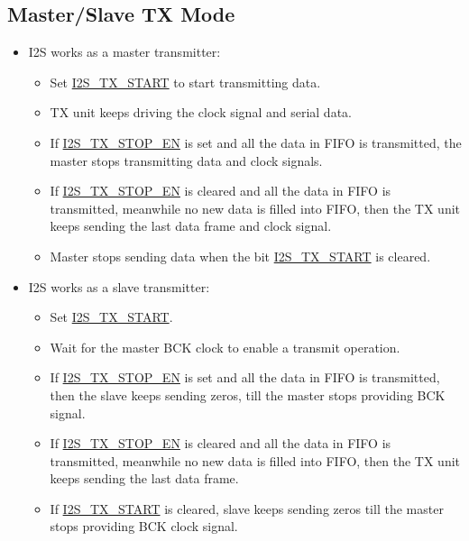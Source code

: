 \documentclass[main\_\_EN.tex]{subfiles}
\begin{document}
\subsection{Master/Slave TX Mode} \label{sec:i2s-master-slave-tx-mode}
\begin{itemize}
    \item I2S works as a master transmitter:
    \begin{itemize}
        \item Set  \hyperref[fielddesc:I2STXSTART]{I2S\_TX\_START} to start transmitting data.
        \item TX unit keeps driving the clock signal and serial data.
        \item If  \hyperref[fielddesc:I2STXSTOPEN]{I2S\_TX\_STOP\_EN} is set and all the data in FIFO is transmitted, the master stops transmitting data and clock signals.
        \item If  \hyperref[fielddesc:I2STXSTOPEN]{I2S\_TX\_STOP\_EN} is cleared and all the data in FIFO is transmitted, meanwhile no new data is filled into FIFO, then the TX unit keeps sending the last data frame and clock signal.
        \item Master stops sending data when the bit  \hyperref[fielddesc:I2STXSTART]{I2S\_TX\_START} is cleared.
    \end{itemize}
    \item I2S works as a slave transmitter:
     \begin{itemize}
        \item Set  \hyperref[fielddesc:I2STXSTART]{I2S\_TX\_START}.
        \item Wait for the master BCK clock to enable a transmit operation.
        \item If  \hyperref[fielddesc:I2STXSTOPEN]{I2S\_TX\_STOP\_EN} is set and all the data in FIFO is transmitted, then the slave keeps sending zeros, till the master stops providing BCK signal.
        \item If  \hyperref[fielddesc:I2STXSTOPEN]{I2S\_TX\_STOP\_EN} is cleared and all the data in FIFO is transmitted, meanwhile no new data is filled into FIFO, then the TX unit keeps sending the last data frame. 
        \item If \hyperref[fielddesc:I2STXSTART]{I2S\_TX\_START} is cleared, slave keeps sending zeros till the master stops providing BCK clock signal.
    \end{itemize}
\end{itemize}
\end{document}
